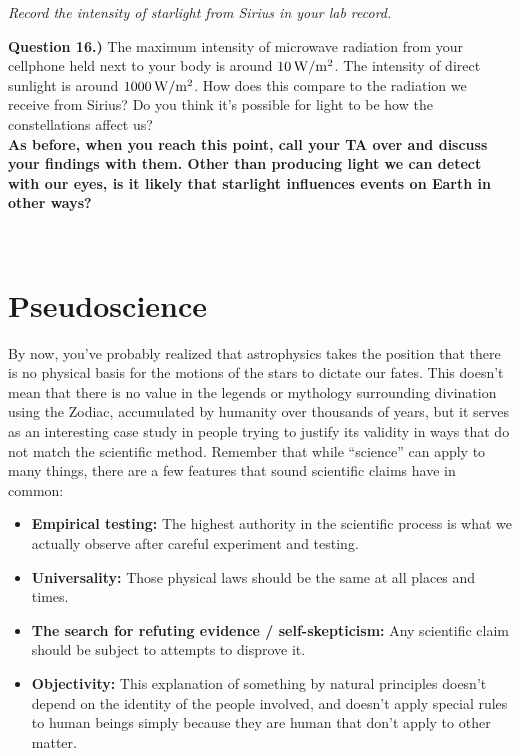 \documentclass[11pt]{article}
\begin{document}
\vspace{1em}

{\it Record the intensity of starlight from Sirius in your lab record.}
\vspace{2em}

\newpage

\textbf{Question 16.)} The maximum intensity of microwave radiation from your cellphone held next to your body is around $10 \rm\, W/m^2$. The intensity of direct sunlight is around $1000 \rm \, W/m^2$. How does this compare to the radiation we receive from Sirius? Do you think it's possible for light to be how the constellations affect us?\\

{\bf As before, when you reach this point, call your TA over and discuss your findings with them. Other than producing light we can detect with our eyes, is it likely that starlight influences events on Earth in other ways?}

\vspace{1.5cm}
\hrulefill\\

\section{Pseudoscience}
By now, you've probably realized that astrophysics takes the position that there is no physical basis for the motions of the stars to dictate our fates. This doesn't mean that there is no value in the legends or mythology surrounding divination using the Zodiac, accumulated by humanity over thousands of years, but it serves as an interesting case study in people trying to justify its validity in ways that do not match the scientific method. Remember that while ``science'' can apply to many things, there are a few features that sound scientific claims have in common:
\begin{itemize}
	
	\item \textbf{Empirical testing:} The highest authority in the scientific process is what we actually observe after careful experiment and testing.\\
	\item \textbf{Universality:} Those physical laws should be the same at all places and times.\\
	\item \textbf{The search for refuting evidence / self-skepticism:} Any scientific claim should be subject to attempts to disprove it.\\
	\item \textbf{Objectivity:} This explanation of something by natural principles doesn't depend on the identity of the people involved, and doesn't apply special rules to human beings simply because they are human that don't apply to other matter.
\end{itemize}
\end{document}
